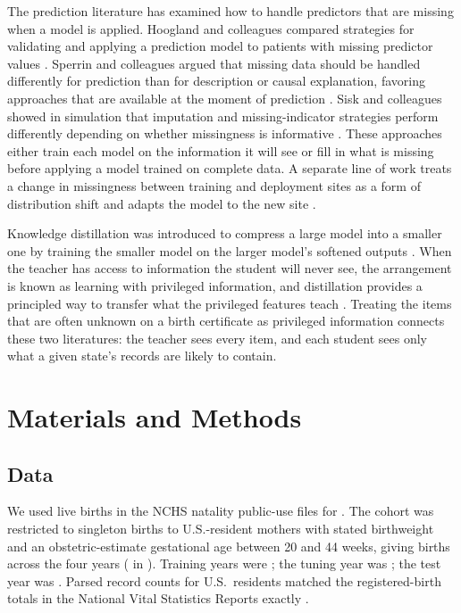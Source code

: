 \documentclass[11pt]{article}
\begin{document}
The prediction literature has examined how to handle predictors that are missing when a model is applied. Hoogland and colleagues compared strategies for validating and applying a prediction model to patients with missing predictor values \citep{hoogland2020}. Sperrin and colleagues argued that missing data should be handled differently for prediction than for description or causal explanation, favoring approaches that are available at the moment of prediction \citep{sperrin2020}. Sisk and colleagues showed in simulation that imputation and missing-indicator strategies perform differently depending on whether missingness is informative \citep{sisk2023}. These approaches either train each model on the information it will see or fill in what is missing before applying a model trained on complete data. A separate line of work treats a change in missingness between training and deployment sites as a form of distribution shift and adapts the model to the new site \citep{zhou2023}.

Knowledge distillation was introduced to compress a large model into a smaller one by training the smaller model on the larger model's softened outputs \citep{hinton2015}. When the teacher has access to information the student will never see, the arrangement is known as learning with privileged information, and distillation provides a principled way to transfer what the privileged features teach \citep{lopezpaz2016}. Treating the items that are often unknown on a birth certificate as privileged information connects these two literatures: the teacher sees every item, and each student sees only what a given state's records are likely to contain.

\section{Materials and Methods}\label{sec:methods}

\subsection{Data}

We used live births in the NCHS natality public-use files \citep{nchs2024files} for \YearsAll. The cohort was restricted to singleton births to U.S.-resident mothers with stated birthweight and an obstetric-estimate gestational age between 20 and 44 weeks, giving \NCohortTotal{} births across the four years (\NCohortTest{} in \TestYear). Training years were \TrainYears; the tuning year was \TuneYear; the test year was \TestYear. Parsed record counts for U.S.\ residents matched the registered-birth totals in the National Vital Statistics Reports exactly \citep{osterman2026}.
\end{document}
